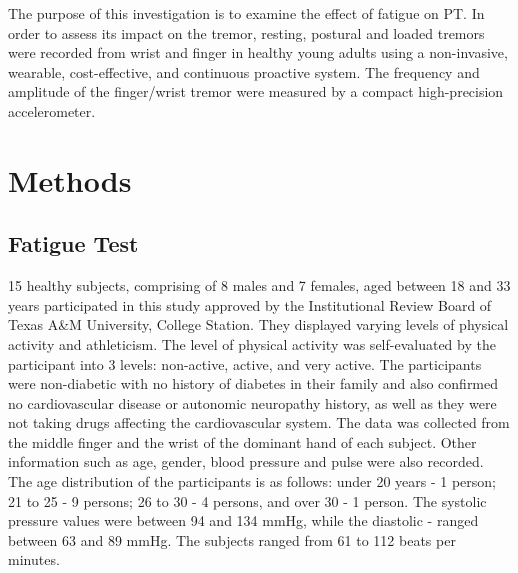 \documentclass[conference, a4paper]{IEEEtran}
\begin{document}
The purpose of this investigation is to examine the effect of fatigue on PT. In order to assess its impact on the tremor, resting, postural and loaded tremors were  recorded from wrist and finger in healthy young adults using a non-invasive, wearable, cost-effective, and continuous proactive system. The frequency and amplitude of the finger/wrist tremor were measured by a compact high-precision accelerometer.
% 
\section{Methods}
%
\subsection{Fatigue Test}
% 
15 healthy subjects, comprising of 8 males and 7 females, aged between 18 and 33 years participated in this study approved by the Institutional Review Board of Texas A\&M University, College Station. They displayed varying levels of physical activity and athleticism. The level of physical activity was self-evaluated by the participant into 3 levels: non-active, active, and very active. The participants were non-diabetic with no history of diabetes in their family and also confirmed no cardiovascular disease or autonomic neuropathy history, as well as they were not taking drugs affecting the cardiovascular system. The data was collected from the middle finger and the wrist of the dominant hand of each subject. Other information such as age, gender, blood pressure and pulse were also recorded. The age distribution of the participants is as follows: under 20 years - 1 person; 21 to 25 - 9 persons; 26 to 30 - 4 persons, and over 30 - 1 person. The systolic pressure values were between 94 and 134 mmHg, while the diastolic - ranged between 63 and 89 mmHg. The subjects ranged from 61 to 112 beats per minutes.
% 
\end{document}
